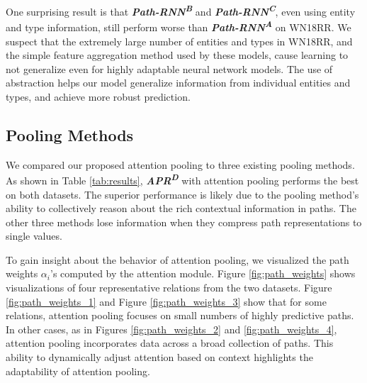 \documentclass[letterpaper]{article} %
\begin{document}
One surprising result is that \textit{\textbf{Path-RNN\textsuperscript{B}}} and \textit{\textbf{Path-RNN\textsuperscript{C}}}, even using entity and type information, still perform worse than \textit{\textbf{Path-RNN\textsuperscript{A}}} on WN18RR. We suspect that the extremely large number of entities and types in WN18RR, and the simple feature aggregation method used by these models, cause learning to not generalize even for highly adaptable neural network models. The use of abstraction helps our model generalize information from individual entities and types, and achieve more robust prediction.
%
%
\subsection{Pooling Methods}
We compared our proposed attention pooling to three existing pooling methods. As shown in Table \ref{tab:results}, \textit{\textbf{APR\textsuperscript{D}}} with attention pooling performs the best on both datasets. The superior performance is likely due to the pooling method's ability to collectively reason about the rich contextual information in paths. The other three methods lose information when they compress path representations to single values. 

To gain insight about the behavior of attention pooling, we visualized the path weights $\alpha_{i}$'s computed by the attention module. Figure \ref{fig:path_weights} shows visualizations of four representative relations from the two datasets. Figure \ref{fig:path_weights_1} and Figure \ref{fig:path_weights_3} show that for some relations, attention pooling focuses on small numbers of highly predictive paths. In other cases, as in Figures \ref{fig:path_weights_2} and \ref{fig:path_weights_4}, attention pooling incorporates data across a broad collection of paths. This ability to dynamically adjust attention based on context highlights the adaptability of attention pooling. %
\end{document}
